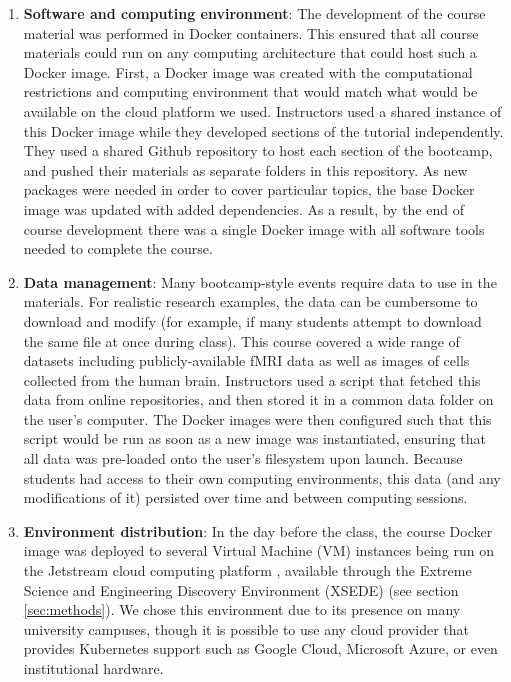 \begin{enumerate}

\item {\bf Software and computing environment}: The development of the course material was
performed in Docker containers. This ensured that all course materials could
run on any computing architecture that could host such a Docker image.
First, a Docker image
\cite{merkel2014docker} was created with the computational restrictions and
computing environment that would match what would be available on the cloud
platform we used. Instructors used a shared instance of this Docker
image while they developed sections of the tutorial independently. They used a
shared Github repository to host each section of the bootcamp, and pushed their
materials as separate folders in this repository. As new packages were needed in
order to cover particular topics, the base Docker image was updated with added
dependencies. As a result, by the end of course development there was a single
Docker image with all software tools needed to complete the course.

\item {\bf Data management}: Many bootcamp-style events require data to use in
the materials. For realistic research examples, the data can be cumbersome to
download and modify (for example, if many students attempt to download the
same file at once during class). This course covered a wide range of datasets
including publicly-available fMRI data
as well as images of cells collected from the human brain. Instructors used a
script that fetched this data from online repositories, and then stored it in
a common data folder on the user's computer. The Docker images were then
configured such that this script would be run as soon as a new image was
instantiated, ensuring that all data was pre-loaded onto the user's
filesystem upon launch. Because students had access to their
own computing environments, this data (and any modifications of it) persisted
over time and between computing sessions.

\item {\bf Environment distribution}: In the
day before the class, the course Docker image was deployed to several Virtual Machine (VM)
instances being run on the Jetstream cloud computing platform
\cite{Stewart2015Jetstream}, available through the Extreme Science and
Engineering Discovery Environment (XSEDE) \cite{Towns2014XSEDE}  (see section
\ref{sec:methods}). We chose this environment due to its presence on many
university campuses, though it is possible to use any cloud provider that
provides Kubernetes support such as Google Cloud, Microsoft Azure, or even
institutional hardware.


\end{enumerate}
